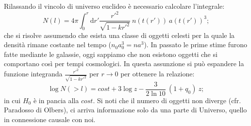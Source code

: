 Rilassando il vincolo di universo euclideo è necessario calcolare l'integrale:
\begin{equation}
N(l)= 4\pi \int_{0}^{r}\mathrm{d}r'\frac{r'^2}{\sqrt{1-kr'^2}}~n(t(r'))~a(t(r'))^3;
\end{equation}
che si risolve assumendo che esista una classe di oggetti celesti per la quale la densità rimane costante nel tempo ($n_0a_0^3=na^3$). In passato le prime stime furono fatte mediante le galassie, oggi sappiamo che non esistono oggetti che si comportano così per tempi cosmologici.
In questa assunzione si può espandere la funzione integranda $\frac{r'^2}{\sqrt{1-kr'^2}}$ per $r\rightarrow 0$ per ottenere la relazione:
\begin{equation}
\log N(>l) = cost + 3\log z - \frac{3}{2\ln 10}~(1+q_0)~z;
\end{equation}
in cui $H_0$ è in pancia alla $cost$. Si noti che il numero di oggetti non diverge (cfr. Paradosso di Olbers), ci arriva informazione solo da una parte di Universo, quello in connessione causale con noi.


